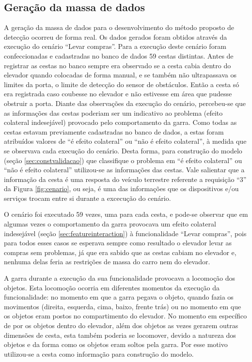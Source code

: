 \subsection{Geração da massa de dados}
\label{subsec:geracaodados}
A geração da massa de dados para o desenvolvimento do método proposto de detecção ocorreu de forma real. Os dados gerados foram obtidos através da execução do cenário ``Levar compras''. Para a execução deste cenário foram confeccionadas e cadastradas no banco de dados 59 cestas distintas. Antes de registrar as cestas no banco sempre era observado se a cesta cabia dentro do elevador quando colocadas de forma manual, e se também não ultrapassava os limites da porta, o limite de detecção do sensor de obstáculos. Então a cesta só era registrada caso coubesse no elevador e não estivesse em área que pudesse obstruir a porta. Diante das observações da execução do cenário, percebeu-se que as informações das cestas poderiam ser um indicativo ao problema (efeito colateral indesejável) provocado pelo comportamento da garra. Como todas as cestas estavam previamente cadastradas no banco de dados, a estas foram atribuídos valores de ``é efeito colateral'' ou ``não é efeito colateral'', à medida que se observava cada execução do cenário. Desta forma, para construção do modelo (seção \ref{sec:constvalidacao}) que classifique o problema em ``é efeito colateral'' ou ``não é efeito colateral'' utilizou-se as informações das cestas. Vale salientar que a informação da cesta é uma resposta do veículo terrestre referente a requisição ``3'' da Figura \ref{fig:cenario}, ou seja, é uma das informações que os dispositivos e/ou serviços trocam entre si durante a excecução do cenário.

O cenário foi executado 59 vezes, uma para cada cesta, e pode-se observar que em algumas vezes o comportamento da garra provocava um efeito colateral indesejável (seção \ref{sec:featureinteraction}) à funcionalidade ``Levar compras'', pois para todos esses casos se esperava sempre como resultado o elevador levar as compras sem problemas, já que era sabido que as cestas cabiam no elevador e, nenhuma delas feria as restrições de massa do carro nem do elevador. 

A garra durante a execução da sua funcionalidade provocava a locomoção dos objetos. Esta locomoção ocorria em diferentes momentos da execução da funcionalidade: no momento em que a garra pegava o objeto, quando fazia os movimentos (direita, esquerda, cima, baixo, frente trás) ou no momento em que os objetos eram postos no compartimento do elevador. No momento em específico de por os objetos dentro do elevador, além dos objetos as vezes gerarem outras dimensões de cesta, esta também poderia se locomover, devido a natureza dos objetos e da forma como os objetos eram soltos pela garra. Por esse motivo utilizou-se a cesta como informação para construção do modelo.

